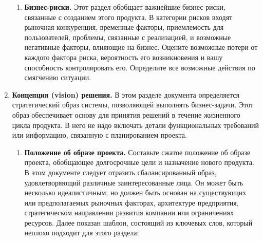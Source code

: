 \documentclass{../../text-style}
\begin{document}
\begin{enumerate}
\begin{enumerate}
        \item \textbf{Бизнес-риски.} Этот раздел обобщает важнейшие бизнес-риски, связанные с созданием этого продукта. В категории рисков входят рыночная конкуренция, временные факторы, приемлемость для пользователей, проблемы, связанные с реализацией, и возможные негативные факторы, влияющие на бизнес. Оцените возможные потери от каждого фактора риска, вероятность его возникновения и вашу способность контролировать его. Определите все возможные действия по смягчению ситуации.
    \end{enumerate}
    \item \textbf{Концепция (vision) решения.} В этом разделе документа определяется стратегический образ системы, позволяющей выполнять бизнес-задачи. Этот образ обеспечивает основу для принятия решений в течение жизненного цикла продукта. В него не надо включать детали функциональных требований или информацию, связанную с планированием проекта.
    \begin{enumerate}
        \item \textbf{Положение об образе проекта.} Составьте сжатое положение об образе проекта, обобщающее долгосрочные цели и назначение нового продукта. В этом документе следует отразить сбалансированный образ, удовлетворяющий различные заинтересованные лица. Он может быть несколько идеалистичным, но должен быть основан на существующих или предполагаемых рыночных факторах, архитектуре предприятия, стратегическом направлении развития компании или ограничениях ресурсов. Далее показан шаблон, состоящий из ключевых слов, который неплохо подходит для этого раздела:


\end{enumerate}
\end{enumerate}
\end{document}
